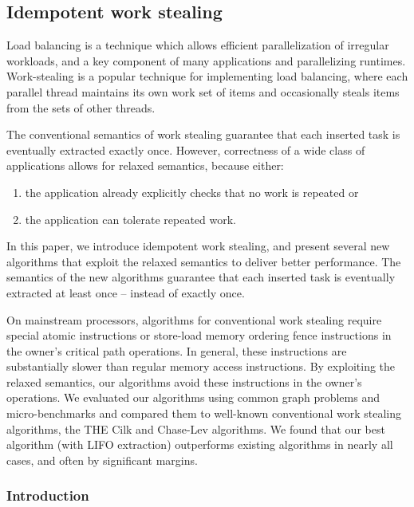 \subsection{Idempotent work stealing \cite{Michael2009}}

Load balancing is a technique which allows efficient parallelization
of irregular workloads, and a key component of many applications and
parallelizing runtimes. Work-stealing is a popular technique for
implementing load balancing, where each parallel thread maintains its
own work set of items and occasionally steals items from the sets of
other threads.

The conventional semantics of work stealing guarantee that each
inserted task is eventually extracted exactly once. However,
correctness of a wide class of applications allows for relaxed
semantics, because either:

\begin{enumerate}
\item the application already explicitly checks that no work is
  repeated or
\item the application can tolerate repeated work.
\end{enumerate}

In this paper, we introduce idempotent work stealing, and present
several new algorithms that exploit the relaxed semantics to deliver
better performance. The semantics of the new algorithms guarantee that
each inserted task is eventually extracted at least once -- instead of
exactly once.

On mainstream processors, algorithms for conventional work stealing
require special atomic instructions or store-load memory ordering
fence instructions in the owner's critical path operations. In
general, these instructions are substantially slower than regular
memory access instructions. By exploiting the relaxed semantics, our
algorithms avoid these instructions in the owner's operations. We
evaluated our algorithms using common graph problems and
micro-benchmarks and compared them to well-known conventional work
stealing algorithms, the THE Cilk and Chase-Lev algorithms. We found
that our best algorithm (with LIFO extraction) outperforms existing
algorithms in nearly all cases, and often by significant margins.

\subsubsection{Introduction}

